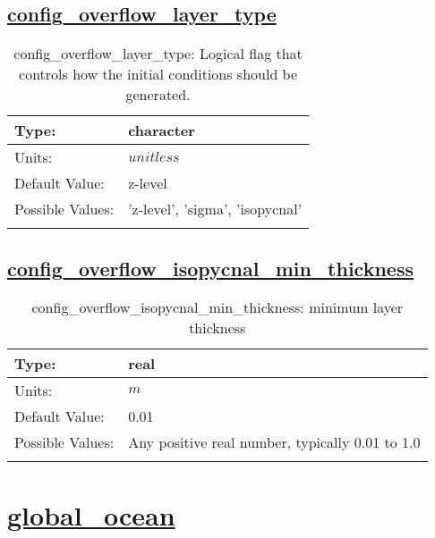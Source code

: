 \subsection[config\_overflow\_layer\_type]{\hyperref[sec:nm_tab_overflow]{config\_overflow\_layer\_type}}
\label{subsec:nm_sec_config_overflow_layer_type}
\begin{center}
\begin{longtable}{| p{2.0in} || p{4.0in} |}
    \hline
    Type: & character \\
    \hline
    Units: & $unitless$ \\
    \hline
    Default Value: & z-level \\
    \hline
    Possible Values: & 'z-level', 'sigma', 'isopycnal' \\
    \hline
    \caption{config\_overflow\_layer\_type: Logical flag that controls how the initial conditions should be generated.}
\end{longtable}
\end{center}
\subsection[config\_overflow\_isopycnal\_min\_thickness]{\hyperref[sec:nm_tab_overflow]{config\_overflow\_isopycnal\_min\_thickness}}
\label{subsec:nm_sec_config_overflow_isopycnal_min_thickness}
\begin{center}
\begin{longtable}{| p{2.0in} || p{4.0in} |}
    \hline
    Type: & real \\
    \hline
    Units: & $m$ \\
    \hline
    Default Value: & 0.01 \\
    \hline
    Possible Values: & Any positive real number, typically 0.01 to 1.0 \\
    \hline
    \caption{config\_overflow\_isopycnal\_min\_thickness: minimum layer thickness}
\end{longtable}
\end{center}
\section[global\_ocean]{\hyperref[sec:nm_tab_global_ocean]{global\_ocean}}
\label{sec:nm_sec_global_ocean}

